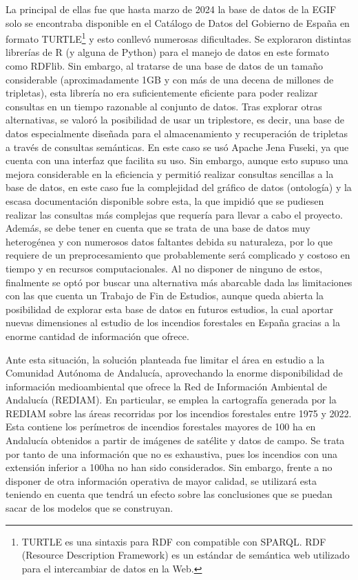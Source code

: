 \documentclass[12pt,a4paper,]{book}
\let\rmarkdownfootnote\footnote%
\def\footnote{\protect\rmarkdownfootnote}
\numberwithin{dummy}{section}
\theoremstyle{ocrenumbox}
\theoremstyle{blacknumex}
\theoremstyle{blacknumbox}
\theoremstyle{ocrenum}
\theoremstyle{ocrenum}
\begin{document}
La principal de ellas fue que hasta marzo de 2024 la base de datos de la
EGIF solo se encontraba disponible en el Catálogo de Datos del Gobierno
de España en formato TURTLE\footnote{TURTLE es una sintaxis para RDF con
  compatible con SPARQL. RDF (Resource Description Framework) es un
  estándar de semántica web utilizado para el intercambiar de datos en
  la Web.} y esto conllevó numerosas dificultades. Se exploraron
distintas librerías de R (y alguna de Python) para el manejo de datos en
este formato como RDFlib. Sin embargo, al tratarse de una base de datos
de un tamaño considerable (aproximadamente 1GB y con más de una decena
de millones de tripletas), esta librería no era suficientemente
eficiente para poder realizar consultas en un tiempo razonable al
conjunto de datos. Tras explorar otras alternativas, se valoró la
posibilidad de usar un triplestore, es decir, una base de datos
especialmente diseñada para el almacenamiento y recuperación de
tripletas a través de consultas semánticas. En este caso se usó Apache
Jena Fuseki, ya que cuenta con una interfaz que facilita su uso. Sin
embargo, aunque esto supuso una mejora considerable en la eficiencia y
permitió realizar consultas sencillas a la base de datos, en este caso
fue la complejidad del gráfico de datos (ontología) y la escasa
documentación disponible sobre esta, la que impidió que se pudiesen
realizar las consultas más complejas que requería para llevar a cabo el
proyecto. Además, se debe tener en cuenta que se trata de una base de
datos muy heterogénea y con numerosos datos faltantes debida su
naturaleza, por lo que requiere de un preprocesamiento que probablemente
será complicado y costoso en tiempo y en recursos computacionales. Al no
disponer de ninguno de estos, finalmente se optó por buscar una
alternativa más abarcable dada las limitaciones con las que cuenta un
Trabajo de Fin de Estudios, aunque queda abierta la posibilidad de
explorar esta base de datos en futuros estudios, la cual aportar nuevas
dimensiones al estudio de los incendios forestales en España gracias a
la enorme cantidad de información que ofrece.

Ante esta situación, la solución planteada fue limitar el área en
estudio a la Comunidad Autónoma de Andalucía, aprovechando la enorme
disponibilidad de información medioambiental que ofrece la Red de
Información Ambiental de Andalucía (REDIAM). En particular, se emplea la
cartografía generada por la REDIAM sobre las áreas recorridas por los
incendios forestales entre 1975 y 2022. Esta contiene los perímetros de
incendios forestales mayores de 100 ha en Andalucía obtenidos a partir
de imágenes de satélite y datos de campo. Se trata por tanto de una
información que no es exhaustiva, pues los incendios con una extensión
inferior a 100ha no han sido considerados. Sin embargo, frente a no
disponer de otra información operativa de mayor calidad, se utilizará
esta teniendo en cuenta que tendrá un efecto sobre las conclusiones que
se puedan sacar de los modelos que se construyan.
\end{document}
